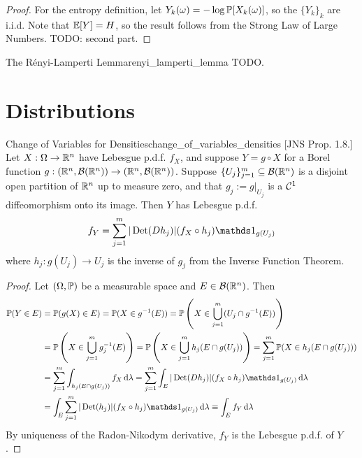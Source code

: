 \begin{proof}
    For the entropy definition, let \(Y_k(\omega) = - \log \mathbb{P}[X_k(\omega)]\), so the \(\{Y_k\}_k\) are i.i.d. Note that \(\mathbb{E}[Y] = H\), so the result follows from the Strong Law of Large Numbers. TODO: second part. 
\end{proof}


\begin{problem}{The R\'enyi-Lamperti Lemma}{renyi_lamperti_lemma}
    TODO. 
\end{problem}

\newpage
\section{Distributions}

\begin{problem}{Change of Variables for Densities}{change_of_variables_densities}
    [JNS Prop. 1.8.] Let \(X : \Omega \to \mathbb{R}^n\) have Lebesgue p.d.f. \(f_X\), and suppose \(Y = g \circ X\) for a Borel function \(g : (\mathbb{R}^n, \mathcal{B}(\mathbb{R}^n)) \to (\mathbb{R}^n, \mathcal{B}(\mathbb{R}^n))\). Suppose \(\{U_j\}_{j=1}^m \subseteq \mathcal{B}(\mathbb{R}^n)\) is a disjoint open partition of \(\mathbb{R}^n\) up to measure zero, and that \(g_j := g|_{U_j}\) is a \(\mathcal{C}^1\) diffeomorphism onto its image. Then \(Y\) has Lebesgue p.d.f.
    \[
        f_Y 
        = \sum_{j=1}^m |\oname{Det}(Dh_j)| (f_X \circ h_j) \ds{1}_{g(U_j)} 
    \]
    where \(h_j : g(U_j) \to U_j\) is the inverse of \(g_j\) from the Inverse Function Theorem.
\end{problem}

\begin{proof}
    Let \((\Omega, \mathbb{P})\) be a measurable space and \(E \in \mathcal{B}(\mathbb{R}^n)\). Then
    \begin{align*}
        \bb{P}(Y \in E)
        &= \bb{P}(g(X) \in E)
        = \bb{P}(X \in g^{-1}(E)) 
        = \bb{P}\left(X \in \bigcup_{j=1}^m (U_j \cap g^{-1}(E))\right) \\
        &= \bb{P}\left(X \in \bigcup_{j=1}^m g_j^{-1}(E)\right) 
        = \bb{P}\left( X \in \bigcup_{j=1}^m h_j(E \cap g(U_j)) \right) = \sum_{j=1}^m \bb{P}(X \in h_j(E \cap g(U_j))) \\
        &= \sum_{j=1}^m \int_{h_j(E \cap g(U_j))} f_X \, \mr{d}\lambda
        = \sum_{j=1}^m \int_{E} |\oname{Det}(Dh_j)| (f_X \circ h_j) \ds{1}_{g(U_j)} \, \mr{d}\lambda \\
        &= \int_{E} \sum_{j=1}^m |\oname{Det}(h_j)| (f_X \circ h_j) \ds{1}_{g(U_j)} \, \mr{d}\lambda 
        \equiv \int_{E} f_Y \, \mr{d}\lambda
    \end{align*}
    By uniqueness of the Radon-Nikodym derivative, \(f_Y\) is the Lebesgue p.d.f. of \(Y\).
\end{proof}

